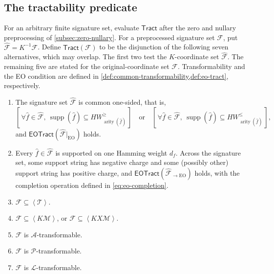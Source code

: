 \documentclass[11pt,letterpaper,onecolumn]{article}
\theoremstyle{plain}
\theoremstyle{definition}
\theoremstyle{remark}
\newcommand{\cF}{\mathcal F}
\newcommand{\cA}{\mathscr A}
\newcommand{\cP}{\mathscr P}
\newcommand{\cL}{\mathscr L}
\newcommand{\cM}{\mathscr M}
\newcommand{\cT}{\mathscr T}
\newcommand{\angles}[1]{\left\langle #1\right\rangle}
\newcommand{\EOTract}{\mathsf{EOTract}}
\newcommand{\Tract}{\mathsf{Tract}}
\newcommand{\supp}{\operatorname{supp}}
\newcommand{\arity}{\operatorname{arity}}
\newcommand{\EO}{\mathrm{EO}}
\begin{document}
	\subsection{The tractability predicate}
	\label{subsec:tract-predicate}
	
	For an arbitrary finite signature set, evaluate \(\Tract\) after the
	zero and nullary preprocessing of \cref{subsec:zero-nullary}.
	For a preprocessed signature set \(\cF\), put
	\(\widehat{\cF}=K^{-1}\cF\).  Define \(\Tract(\cF)\) to be the disjunction
	of the following seven alternatives, which may overlap.  The first two
test the \(K\)-coordinate set \(\widehat{\cF}\). The remaining five are
stated for the original-coordinate set \(\cF\).
Transformability and the EO condition are defined in
\cref{def:common-transformability,def:eo-tract}, respectively.
	
	\begin{enumerate}[label=\textnormal{(\arabic*)}]
		\item \label{case:one-sided}
		The signature set \(\widehat{\cF}\) is common one-sided, that is,
		\[
		[\,\forall\widehat f\in\widehat{\cF},\
		\supp(\widehat f)\subseteq HW_{\arity(\widehat f)}^{\ge}\,]
		\quad\text{or}\quad
		[\,\forall\widehat f\in\widehat{\cF},\
		\supp(\widehat f)\subseteq HW_{\arity(\widehat f)}^{\le}\,],
		\]
		and \(\EOTract(\widehat{\cF}|_{\EO})\) holds.
		
		\item \label{case:single-weight}
		Every \(\widehat f\in\widehat{\cF}\) is supported on one Hamming
		weight \(d_f\).  Across the signature set, some support string has negative
		charge and some (possibly other) support string has positive charge, and
		\(\EOTract(\widehat{\cF}_{\to\EO})\) holds, with the completion
		operation defined in \cref{eq:eo-completion}.
		
		\item \label{case:arity-two}
		\(\cF\subseteq\angles{\cT}\).
		
		\item \label{case:matching}
		\(\cF\subseteq\angles{K\cM}\), or
		\(\cF\subseteq\angles{KX\cM}\).
		
		\item \label{case:affine}
		\(\cF\) is \(\cA\)-transformable.
		
		\item \label{case:product}
		\(\cF\) is \(\cP\)-transformable.
		
		\item \label{case:local-affine}
		\(\cF\) is \(\cL\)-transformable.
	\end{enumerate}
	
\end{document}

